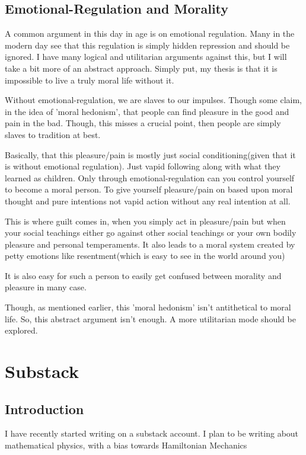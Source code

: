 \section{Emotional-Regulation and Morality}
\par A common argument in this day in age is on emotional regulation. Many in the modern day see that this regulation is simply hidden repression and should be ignored. I have many logical and utilitarian arguments against this, but I will take a bit more of an abstract approach. Simply put, my thesis is that it is impossible to live a truly moral life without it.
\par Without emotional-regulation, we are slaves to our impulses. Though some claim, in the idea of 'moral hedonism', that people can find pleasure in the good and pain in the bad. Though, this misses a crucial point, then people are simply slaves to tradition at best.
\par Basically, that this pleasure/pain is mostly just social conditioning(given that it is without emotional regulation). Just vapid following along with what they learned as children. Only through emotional-regulation can you control yourself to become a moral person. To give yourself pleasure/pain on based upon moral thought and pure intentions not vapid action without any real intention at all.
\par This is where guilt comes in, when you simply act in pleasure/pain but when your social teachings either go against other social teachings or your own bodily pleasure and personal temperaments. It also leads to a moral system created by petty emotions like resentment(which is easy to see in the world around you)
\par It is also easy for such a person to easily get confused between morality and pleasure in many case.
\\
\par Though, as mentioned earlier, this 'moral hedonism' isn't antithetical to moral life. So, this abstract argument isn't enough. A more utilitarian mode should be explored.


\chapter{Substack}
\section{Introduction}
\par I have recently started writing on a substack account. I plan to be writing about mathematical physics, with a bias towards Hamiltonian Mechanics 
